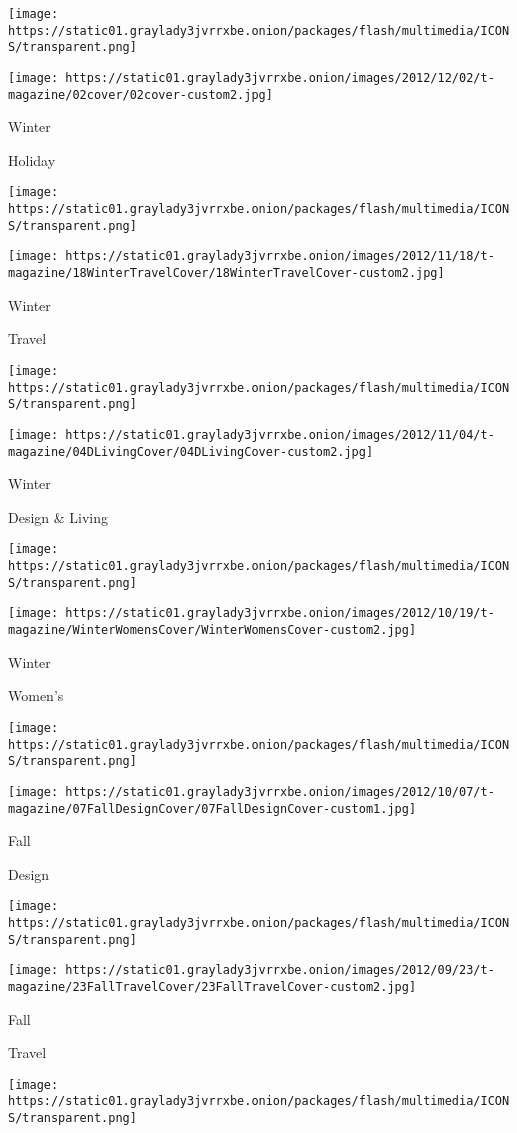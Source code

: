\texttt{[image: https://static01.graylady3jvrrxbe.onion/packages/flash/multimedia/ICONS/transparent.png]}

\texttt{[image: https://static01.graylady3jvrrxbe.onion/images/2012/12/02/t-magazine/02cover/02cover-custom2.jpg]}

Winter

Holiday

\texttt{[image: https://static01.graylady3jvrrxbe.onion/packages/flash/multimedia/ICONS/transparent.png]}

\texttt{[image: https://static01.graylady3jvrrxbe.onion/images/2012/11/18/t-magazine/18WinterTravelCover/18WinterTravelCover-custom2.jpg]}

Winter

Travel

\texttt{[image: https://static01.graylady3jvrrxbe.onion/packages/flash/multimedia/ICONS/transparent.png]}

\texttt{[image: https://static01.graylady3jvrrxbe.onion/images/2012/11/04/t-magazine/04DLivingCover/04DLivingCover-custom2.jpg]}

Winter

Design \& Living

\texttt{[image: https://static01.graylady3jvrrxbe.onion/packages/flash/multimedia/ICONS/transparent.png]}

\texttt{[image: https://static01.graylady3jvrrxbe.onion/images/2012/10/19/t-magazine/WinterWomensCover/WinterWomensCover-custom2.jpg]}

Winter

Women's

\texttt{[image: https://static01.graylady3jvrrxbe.onion/packages/flash/multimedia/ICONS/transparent.png]}

\texttt{[image: https://static01.graylady3jvrrxbe.onion/images/2012/10/07/t-magazine/07FallDesignCover/07FallDesignCover-custom1.jpg]}

Fall

Design

\texttt{[image: https://static01.graylady3jvrrxbe.onion/packages/flash/multimedia/ICONS/transparent.png]}

\texttt{[image: https://static01.graylady3jvrrxbe.onion/images/2012/09/23/t-magazine/23FallTravelCover/23FallTravelCover-custom2.jpg]}

Fall

Travel

\texttt{[image: https://static01.graylady3jvrrxbe.onion/packages/flash/multimedia/ICONS/transparent.png]}

